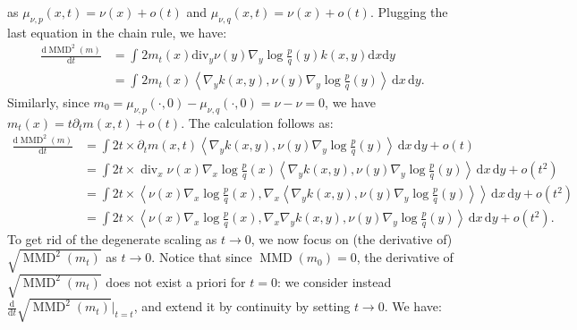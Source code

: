 \documentclass{uai2023} %
\begin{document}
as $\mu_{\nu, p}(x, t) = \nu(x) + o(t) $ and $ \mu_{\nu, q}(x, t) = \nu(x) + o(t) $.
Plugging the last equation in the chain rule, we have:
\begin{equation*}
\begin{split}
	\frac{\mathrm{d} \operatorname{MMD}^2(m)}{\mathrm{d}t}					&= \int_{  }^{  } 2 m_t(x) \text{div}_y \nu(y) \nabla_{ y } \log \frac{ p }{ q }(y) k(x,y) \text{d}x \text{d}y \\
						& = \int_{  }^{  } 2m_t(x) \left \langle \nabla_{ y }  k(x, y), \nu(y) \nabla_{ y } \log \frac{ p }{ q }(y) \right \rangle \,\mathrm{d}x \,\mathrm{d}y.
\end{split}
\end{equation*}
Similarly, since $ m_0 = \mu_{\nu, p}(\cdot, 0) - \mu_{\nu, q}(\cdot, 0) = \nu - \nu = 0 $, we have $ m_t(x) = t \partial_t m(x, t) + o(t)$. The calculation follows as:
\begin{equation*}
\begin{split}
    \frac{\mathrm{d} \operatorname{MMD}^2(m)}{ \mathrm{d} t} &= \int 2 t \times \partial_t m(x, t) \left \langle \nabla_{ y }  k(x, y), \nu(y) \nabla_{ y } \log \frac{ p }{ q }(y) \right \rangle \,\mathrm{d}x \,\mathrm{d}y + o(t) \\
	&= \int 2 t \times \operatorname{div}_x \nu(x) \nabla_{ x } \log \frac{ p }{ q }(x) \left \langle \nabla_{ y }  k(x, y), \nu(y) \nabla_{ y } \log \frac{ p }{ q }(y) \right \rangle \,\mathrm{d}x \,\mathrm{d}y  + o(t^2) \\
	&= \int 2 t \times \left \langle  \nu(x)\nabla_{ x }\log \frac{ p }{ q }(x), \nabla_{ x }  \left \langle \nabla_{ y }  k(x, y), \nu(y) \nabla_{ y } \log \frac{ p }{ q }(y) \right \rangle \right \rangle \,\mathrm{d}x \,\mathrm{d}y  + o(t^2)\\
	&= \int 2 t \times \left \langle  \nu(x)\nabla_{ x }\log \frac{ p }{ q }(x), \nabla_{ x }  \nabla_{ y }  k(x, y), \nu(y) \nabla_{ y } \log \frac{ p }{ q }(y) \right \rangle \,\mathrm{d}x \,\mathrm{d}y + o(t^2).
\end{split}
\end{equation*}
To get rid of the degenerate scaling as $ t  \to 0 $, we now focus on (the
derivative of) $ \sqrt {\operatorname{MMD}^2(m_t)}  $ as $ t  \to 0 $. Notice that
since $ \operatorname{MMD}(m_0) = 0 $, the derivative of $ \sqrt {\operatorname{MMD}^2(m_t)}$
does not exist a priori for $ t=0 $: we consider instead  $ \frac{\mathrm{d}}{\mathrm{d}t } \sqrt {\operatorname{MMD}^2(m_t)}\Big|_{t=t}  $, and extend it by continuity by setting $
t  \to 0 $. We have:
\end{document}
